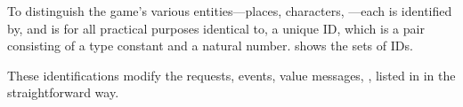 To distinguish the game's various entities---places, characters,
\etc---each is identified by, and is for all practical purposes
identical to, a unique ID, which is a pair consisting of a type
constant and a natural number.  shows the sets of IDs.

These identifications modify the requests, events, value messages,
\etc, listed in  in the straightforward way.
